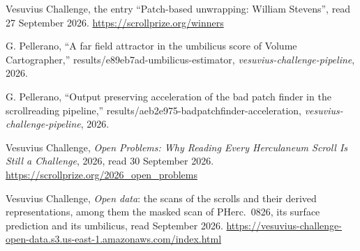 
 Vesuvius Challenge, the entry ``Patch-based unwrapping: William
  Stevens'', read 27 September 2026. \url{https://scrollprize.org/winners}


 G. Pellerano, ``A far field attractor in the umbilicus score of Volume
  Cartographer,'' results/e89eb7ad-umbilicus-estimator, \emph{vesuvius-challenge-pipeline}, 2026.

 G. Pellerano, ``Output preserving acceleration of the bad patch finder in the
  scrollreading pipeline,'' results/aeb2e975-badpatchfinder-acceleration,
  \emph{vesuvius-challenge-pipeline}, 2026.

 Vesuvius Challenge, \emph{Open Problems: Why Reading Every Herculaneum Scroll Is Still a
  Challenge}, 2026, read 30 September 2026. \url{https://scrollprize.org/2026_open_problems}

 Vesuvius Challenge, \emph{Open data}: the scans of the scrolls and their derived representations,
  among them the masked scan of PHerc.~0826, its surface prediction and its umbilicus, read September 2026.
  \url{https://vesuvius-challenge-open-data.s3.us-east-1.amazonaws.com/index.html}

